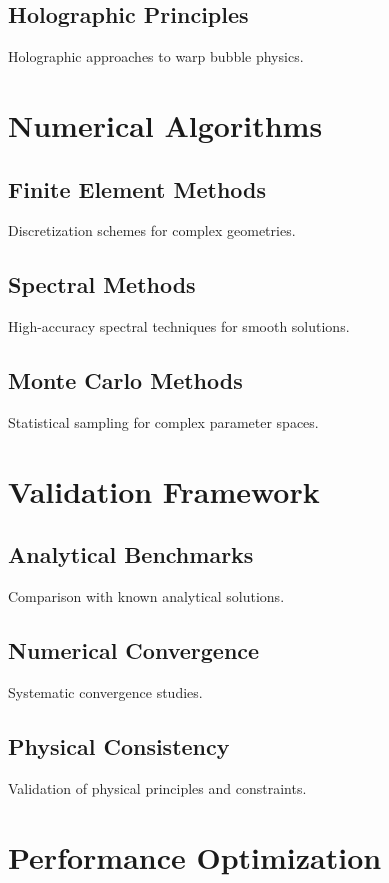 \documentclass{article}
\begin{document}
\subsection{Holographic Principles}
Holographic approaches to warp bubble physics.

\section{Numerical Algorithms}

\subsection{Finite Element Methods}
Discretization schemes for complex geometries.

\subsection{Spectral Methods}
High-accuracy spectral techniques for smooth solutions.

\subsection{Monte Carlo Methods}
Statistical sampling for complex parameter spaces.

\section{Validation Framework}

\subsection{Analytical Benchmarks}
Comparison with known analytical solutions.

\subsection{Numerical Convergence}
Systematic convergence studies.

\subsection{Physical Consistency}
Validation of physical principles and constraints.

\section{Performance Optimization}
\end{document}
